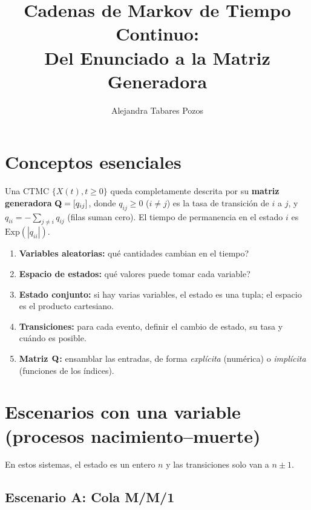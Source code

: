 \documentclass[11pt, letterpaper]{article}
\title{Cadenas de Markov de Tiempo Continuo: \\ Del Enunciado a la Matriz Generadora}
\author{Alejandra Tabares Pozos}
\date{}
\begin{document}
\maketitle
\tableofcontents
\newpage

\section{Conceptos esenciales}

Una CTMC $\{X(t), t\ge0\}$ queda completamente descrita por su \textbf{matriz generadora} $\mathbf{Q}=[q_{ij}]$, donde $q_{ij}\ge0$ ($i\neq j$) es la tasa de transici\'on de $i$ a $j$, y $q_{ii}=-\sum_{j\neq i}q_{ij}$ (filas suman cero). El tiempo de permanencia en el estado $i$ es $\text{Exp}(|q_{ii}|)$.

\begin{metodobox}
\begin{enumerate}
    \item \textbf{Variables aleatorias:} \textquestiondown{}qu\'e cantidades cambian en el tiempo?
    \item \textbf{Espacio de estados:} \textquestiondown{}qu\'e valores puede tomar cada variable?
    \item \textbf{Estado conjunto:} si hay varias variables, el estado es una tupla; el espacio es el producto cartesiano.
    \item \textbf{Transiciones:} para cada evento, definir el cambio de estado, su tasa y cu\'ando es posible.
    \item \textbf{Matriz $\mathbf{Q}$:} ensamblar las entradas, de forma \emph{expl\'icita} (num\'erica) o \emph{impl\'icita} (funciones de los \'indices).
\end{enumerate}
\end{metodobox}

\section{Escenarios con una variable (procesos nacimiento--muerte)}

En estos sistemas, el estado es un entero $n$ y las transiciones solo van a $n\pm1$.

\subsection{Escenario A: Cola M/M/1}
\end{document}
